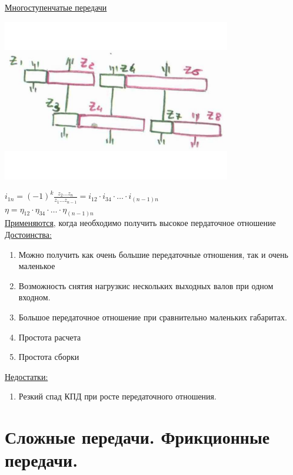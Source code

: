 \documentclass{article}
\begin{document}
\underline{Многоступенчатые передачи} 

\includegraphics[width = 0.75\textwidth]{17_2}

$i_{1n} = (-1)^k \frac{z_2 \dots z_n}{z_1 \dots z_{n-1}} = i_{12} \cdot i_{34} \cdot \dots \cdot i_{(n-1)n}$\\
$\eta = \eta_{12} \cdot \eta_{34} \cdot \dots \cdot \eta_{(n-1)n}$\\

\underline{Применяются}, когда необходимо получить высокое пердаточное отношение
\underline{Достоинства:}
\begin{enumerate}
	\item Можно получить как очень большие передаточные отношения, так и очень маленькое
	\item Возможность снятия нагрузкис нескольких выходных валов при одном входном.
	\item Большое передаточное отношение при сравнительно маленьких габаритах.
	\item Простота расчета
	\item Простота сборки
\end{enumerate}
\underline{Недостатки:} 
\begin{enumerate}
	\item Резкий спад КПД при росте передаточного отношения.
\end{enumerate}

\section {Сложные передачи. Фрикционные передачи.}
\end{document}
